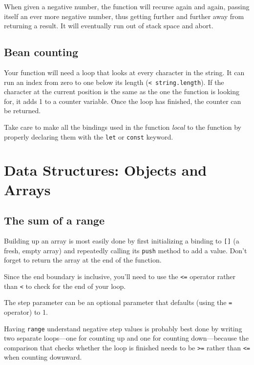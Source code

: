 When given a negative number, the function will recurse again and again, passing itself an ever more negative number, thus getting further and further away from returning a result. It will eventually run out of stack space and abort.

\subsection{Bean counting}

Your function will need a loop that looks at every character in the string. It can run an index from zero to one below its length (\lstinline`< string.length`). If the character at the current position is the same as the one the function is looking for, it adds 1 to a counter variable. Once the loop has finished, the counter can be returned.

Take care to make all the bindings used in the function \emph{local} to the function by properly declaring them with the \lstinline`let` or \lstinline`const` keyword.

\section{Data Structures: Objects and Arrays}

\subsection{The sum of a range}

Building up an array is most easily done by first initializing a binding to \lstinline`[]` (a fresh, empty array) and repeatedly calling its \lstinline`push` method to add a value. Don't forget to return the array at the end of the function.

Since the end boundary is inclusive, you'll need to use the \lstinline`<=` operator rather than \lstinline`<` to check for the end of your loop.

The step parameter can be an optional parameter that defaults (using the \lstinline`=` operator) to 1.

Having \lstinline`range` understand negative step values is probably best done by writing two separate loops—one for counting up and one for counting down—because the comparison that checks whether the loop is finished needs to be \lstinline`>=` rather than \lstinline`<=` when counting downward.


